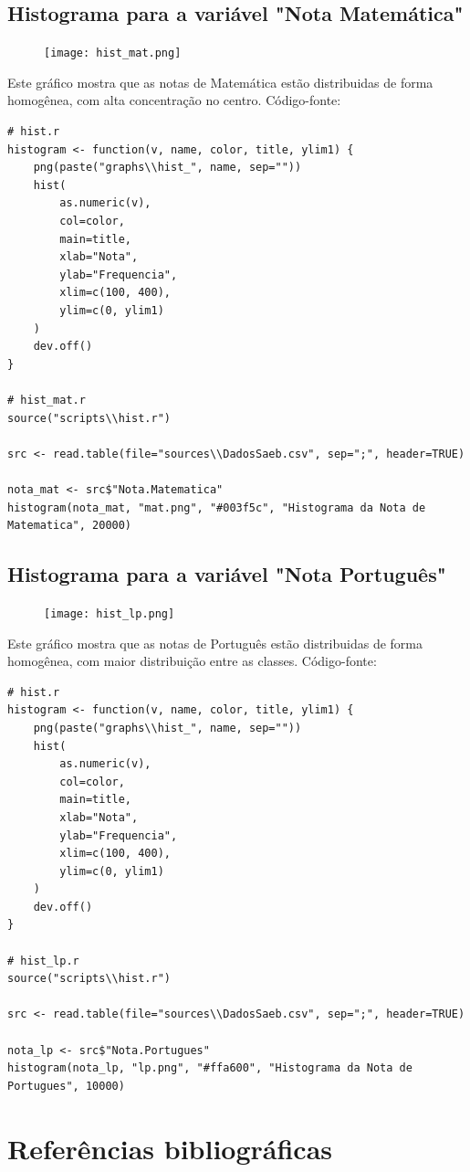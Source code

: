 \documentclass[17pt]{extarticle}
\begin{document}
\subsection{Histograma para a variável "Nota Matemática"}
\begin{figure}[H]
    \texttt{[image: hist\_mat.png]}
    \centering
\end{figure}
Este gráfico mostra que as notas de Matemática estão distribuidas de forma homogênea, com alta concentração no centro. \newline
Código-fonte: \newline
\begin{lstlisting}
# hist.r
histogram <- function(v, name, color, title, ylim1) {
    png(paste("graphs\\hist_", name, sep=""))
    hist(
        as.numeric(v),
        col=color,
        main=title,
        xlab="Nota",
        ylab="Frequencia",
        xlim=c(100, 400),
        ylim=c(0, ylim1)
    )
    dev.off()
}

# hist_mat.r
source("scripts\\hist.r")

src <- read.table(file="sources\\DadosSaeb.csv", sep=";", header=TRUE)

nota_mat <- src$"Nota.Matematica"
histogram(nota_mat, "mat.png", "#003f5c", "Histograma da Nota de Matematica", 20000)
\end{lstlisting}

\subsection{Histograma para a variável "Nota Português"}
\begin{figure}[H]
    \texttt{[image: hist\_lp.png]}
    \centering
\end{figure}
Este gráfico mostra que as notas de Português estão distribuidas de forma homogênea, com maior distribuição entre as classes. \newline
Código-fonte: \newline
\begin{lstlisting}
# hist.r
histogram <- function(v, name, color, title, ylim1) {
    png(paste("graphs\\hist_", name, sep=""))
    hist(
        as.numeric(v),
        col=color,
        main=title,
        xlab="Nota",
        ylab="Frequencia",
        xlim=c(100, 400),
        ylim=c(0, ylim1)
    )
    dev.off()
}

# hist_lp.r
source("scripts\\hist.r")

src <- read.table(file="sources\\DadosSaeb.csv", sep=";", header=TRUE)

nota_lp <- src$"Nota.Portugues"
histogram(nota_lp, "lp.png", "#ffa600", "Histograma da Nota de Portugues", 10000)
\end{lstlisting}

\newpage
\section{Referências bibliográficas}
\end{document}
